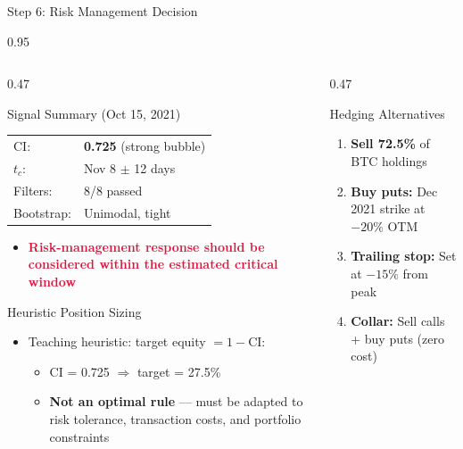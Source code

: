 \documentclass[9pt, aspectratio=169, t]{beamer}
\begin{document}
\begin{frame}{Step 6: Risk Management Decision}
    \begin{cminipage}{0.95\textwidth}
    {\footnotesize
    \begin{columns}[T]
        \begin{column}{0.47\textwidth}
            \begin{alertblock}{Signal Summary (Oct 15, 2021)}
                \begin{tabular}{ll}
                    CI: & \textbf{0.725} (strong bubble) \\
                    $t_c$: & Nov 8 $\pm$ 12 days \\
                    Filters: & 8/8 passed \\
                    Bootstrap: & Unimodal, tight \\
                \end{tabular}

                \begin{itemize}\setlength{\itemsep}{0pt}
                    \item \textcolor{Crimson}{\textbf{Risk-management response should be considered within the estimated critical window}}
                \end{itemize}
            \end{alertblock}

            \begin{block}{Heuristic Position Sizing}
                \begin{itemize}\setlength{\itemsep}{0pt}
                    \item Teaching heuristic: target equity $= 1 - \text{CI}$:
                    \begin{itemize}\setlength{\itemsep}{0pt}
                        \item CI = 0.725 $\Rightarrow$ target = 27.5\%
                        \item \textbf{Not an optimal rule} --- must be adapted to risk tolerance, transaction costs, and portfolio constraints
                    \end{itemize}
                \end{itemize}
            \end{block}
        \end{column}
        \begin{column}{0.47\textwidth}
            \begin{exampleblock}{Hedging Alternatives}
                \begin{enumerate}\setlength{\itemsep}{1pt}
                    \item \textbf{Sell 72.5\%} of BTC holdings
                    \item \textbf{Buy puts:} Dec 2021 strike at $-20\%$ OTM
                    \item \textbf{Trailing stop:} Set at $-15\%$ from peak
                    \item \textbf{Collar:} Sell calls + buy puts (zero cost)
                \end{enumerate}
            \end{exampleblock}


\end{column}
\end{columns}}
\end{cminipage}
\end{frame}
\end{document}
